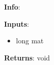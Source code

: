 \textbf{Info}:

\noindent \textbf{Inputs}:
\begin{itemize}
\item{long mat}
\end{itemize}

\noindent \textbf{Returns}: void
